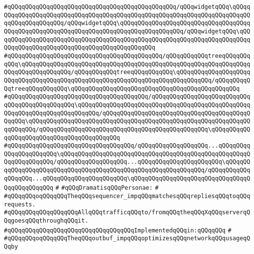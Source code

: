 \verb|#qQQqqQQqqQQqqQQqqQQqqQQqqQQqqQQqqQQqqQQqqQQqqQQq/qQQqwidgetqQQq\qQQqqQQqqQQqqQQqqQQqqQQqqQQqqQQqqQQqqQQqqQQqqQQqqQQqqQQqqQQqqQQqqQQqqQQqqQQqqQQqqQQqqQQqqQQq/qQQqwidgetqQQq\qQQqqQQqqQQqqQQqqQQqqQQqqQQqqQQqqQQqqQQqqQQqqQQqqQQqqQQqqQQqqQQqqQQqqQQqqQQqqQQqqQQqqQQq/qQQqwidgetqQQq\qQQqqQQqqQQqqQQqqQQqqQQqqQQqqQQqqQQqqQQqqQQqqQQqqQQqqQQqqQQqqQQqqQQqqQQqqQQqqQQqqQQqqQQqqQQqqQQqqQQqqQQqqQQqqQQqqQQq|\newline
\verb|#qQQqqQQqqQQqqQQqqQQqqQQqqQQqqQQqqQQqqQQqqQQq/qQQqqQQqqQQqtreeqQQqqQQqqQQq\qQQqqQQqqQQqqQQqqQQqqQQqqQQqqQQqqQQqqQQqqQQqqQQqqQQqqQQqqQQqqQQqqQQqqQQqqQQqqQQqqQQq/qQQqqQQqqQQqtreeqQQqqQQqqQQq\qQQqqQQqqQQqqQQqqQQqqQQqqQQqqQQqqQQqqQQqqQQqqQQqqQQqqQQqqQQqqQQqqQQqqQQqqQQqqQQq/qQQqqQQqqQQqtreeqQQqqQQqqQQq\qQQqqQQqqQQqqQQqqQQqqQQqqQQqqQQqqQQqqQQqqQQqqQQq|\newline
\verb|#qQQqqQQqqQQqqQQqqQQqqQQqqQQqqQQqqQQqqQQq/qQQqqQQqqQQqqQQqqQQqqQQqqQQqqQQqqQQqqQQqqQQqqQQq\qQQqqQQqqQQqqQQqqQQqqQQqqQQqqQQqqQQqqQQqqQQqqQQqqQQqqQQqqQQqqQQqqQQqqQQqqQQq/qQQqqQQqqQQqqQQqqQQqqQQqqQQqqQQqqQQqqQQqqQQqqQQq\qQQqqQQqqQQqqQQqqQQqqQQqqQQqqQQqqQQqqQQqqQQqqQQqqQQqqQQqqQQqqQQqqQQqqQQq/qQQqqQQqqQQqqQQqqQQqqQQqqQQqqQQqqQQqqQQqqQQqqQQq\qQQqqQQqqQQqqQQqqQQqqQQqqQQqqQQqqQQqqQQqqQQq|\newline
\verb|#qQQqqQQqqQQqqQQqqQQqqQQqqQQqqQQqqQQq/qQQqqQQqqQQqqQQqqQQq...qQQqqQQqqQQqqQQqqQQqqQQq\qQQqqQQqqQQqqQQqqQQqqQQqqQQqqQQqqQQqqQQqqQQqqQQqqQQqqQQqqQQqqQQqqQQq/qQQqqQQqqQQqqQQqqQQq...qQQqqQQqqQQqqQQqqQQqqQQq\qQQqqQQqqQQqqQQqqQQqqQQqqQQqqQQqqQQqqQQqqQQqqQQqqQQqqQQqqQQqqQQq/qQQqqQQqqQQqqQQqqQQq...qQQqqQQqqQQqqQQqqQQqqQQq\qQQqqQQqqQQqqQQqqQQqqQQqqQQqqQQqqQQqqQQqqQQqqQQq|\newline
\verb|#|\newline
\verb|#qQQqDramatisqQQqPersonae:|\newline
\verb|#|\newline
\verb|#qQQqqQQqoqQQqqQQqTheqQQqsequencer_impqQQqmatchesqQQqrepliesqQQqtoqQQqrequests.|\newline
\verb|#qQQqqQQqqQQqqQQqqQQqAllqQQqtrafficqQQqto/fromqQQqtheqQQqXqQQqserverqQQqgoesqQQqthroughqQQqit.|\newline
\verb|#qQQqqQQqqQQqqQQqqQQqqQQqqQQqqQQqqQQqImplementedqQQqin:qQQqqQQq|\newline
\verb|#|\newline
\verb|#qQQqqQQqoqQQqqQQqTheqQQqoutbuf_impqQQqoptimizesqQQqnetworkqQQqusageqQQqby|\newline
